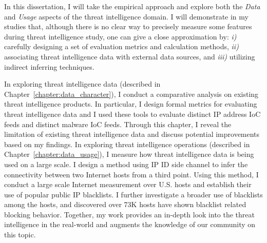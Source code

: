 In this dissertation, I will take the empirical approach 
and explore both the \textit{Data} and \textit{Usage} aspects of the threat 
intelligence domain.
I will demonstrate in my studies that, although there is no
clear way to precisely measure some features during threat intelligence
study, one can give a close approximation by: \textit{i)} carefully designing a 
set of evaluation metrics and calculation methods, \textit{ii)} associating threat
intelligence data with external data sources, and \textit{iii)} utilizing indirect 
inferring techniques. 

In exploring threat intelligence data (described in
Chapter~\ref{chapter:data_character}), I conduct a comparative analysis on
existing threat intelligence products. In particular, I design formal 
metrics for evaluating threat intelligence data and I used these tools to 
evaluate {\numipfeeds} distinct IP address IoC feeds and {\numhashfeeds}
distinct malware IoC feeds. Through this chapter, I reveal the limitation of
existing threat intelligence data and discuss potential improvements 
based on my findings. In exploring threat intelligence operations 
(described in Chapter~\ref{chapter:data_usage}),
I measure how threat intelligence data is being used on a large scale. 
I design a method using IP ID side channel to infer the connectivity 
between two Internet hosts from a third point. Using this 
method, I conduct a large scale Internet measurement over {} 
U.S. hosts and establish their use of {\blacklistnum} popular public IP
blacklists. I further investigate a broader use of blacklists among the 
hosts, and discovered over 73K hosts have shown blacklist related blocking 
behavior. Together, my work provides an in-depth look into the threat 
intelligence in the real-world and augments the knowledge of our community on 
this topic.





